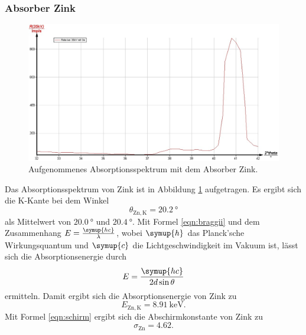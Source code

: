 \subsubsection{Absorber Zink}
\begin{figure}
	\centering
	\includegraphics[width=1.0\textwidth]{nIKO_und_jULIAN_ÜLADS/zink.jpg}
	\caption{Aufgenommenes Absorptionsspektrum mit dem Absorber Zink.}
	\label{fig:zink_absorber}
\end{figure}
Das Absorptionsspektrum von Zink ist in Abbildung \ref{fig:zink_absorber} aufgetragen.
Es ergibt sich die K-Kante bei dem Winkel
\begin{equation*}
	\theta_{\mathrm{Zn,K}} = \SI{20,2}{\degree}
\end{equation*}
als Mittelwert von $\SI{20,0}{\degree}$ und $\SI{20,4}{\degree}$.
Mit Formel \eqref{eqn:braggii} und dem Zusammenhang $E = \frac{\symup{hc}}{\lambda}$,
wobei $\symup{h}$
das Planck'sche Wirkungsquantum und $\symup{c}$ die Lichtgeschwindigkeit im Vakuum ist, lässt
sich die Absorptionsenergie durch
\begin{equation}
	\label{eqn:Absorptionsenergie}
	E = \frac{\symup{hc}}{2d\sin\theta}
\end{equation}
ermitteln.
Damit ergibt sich die Absorptionsenergie von Zink zu
\begin{equation*}
	E_{\mathrm{Zn,K}} = \SI{8,91}{\kilo\electronvolt} \mathrm{.}
\end{equation*}
Mit Formel \eqref{eqn:schirm} ergibt sich die Abschirmkonstante von Zink zu
\begin{equation*}
	\sigma_{\mathrm{Zn}} = \num{4,62} \mathrm{.}
\end{equation*}

\FloatBarrier
